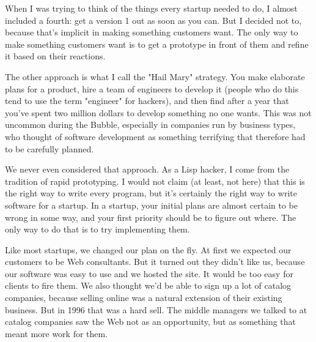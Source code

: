 When
                    I was trying to think of the things every startup needed to
                    do, I almost included a fourth: get a version 1 out as soon
                    as you can. But I decided not to, because that's implicit in
                    making something customers want. The only way to make
                    something customers want is to get a prototype in front of
                    them and refine it based on their reactions.

The
                    other approach is what I call the "Hail Mary" strategy. You
                    make elaborate plans for a product, hire a team of engineers
                    to develop it (people who do this tend to use the term
                    "engineer" for hackers), and then find after a year that
                    you've spent two million dollars to develop something no one
                    wants. This was not uncommon during the Bubble, especially
                    in companies run by business types, who thought of software
                    development as something terrifying that therefore had to be
                    carefully planned.

We never even considered that
                    approach. As a Lisp hacker, I come from the tradition of
                    rapid prototyping. I would not claim (at least, not here)
                    that this is the right way to write every program, but it's
                    certainly the right way to write software for a startup. In
                    a startup, your initial plans are almost certain to be wrong
                    in some way, and your first priority should be to figure out
                    where. The only way to do that is to try implementing
                    them.

Like most startups, we changed our plan on
                    the fly. At first we expected our customers to be Web
                    consultants. But it turned out they didn't like us, because
                    our software was easy to use and we hosted the site. It
                    would be too easy for clients to fire them. We also thought
                    we'd be able to sign up a lot of catalog companies, because
                    selling online was a natural extension of their existing
                    business. But in 1996 that was a hard sell. The middle
                    managers we talked to at catalog companies saw the Web not
                    as an opportunity, but as something that meant more work for
                    them.

